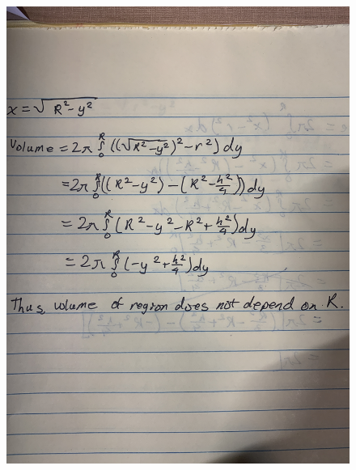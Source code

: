 \documentclass{article}
\begin{document}
    \begin{figure}[hbt!]
        \centering
        \includegraphics[scale=0.08]{drill2}
    \end{figure}
\end{document}
